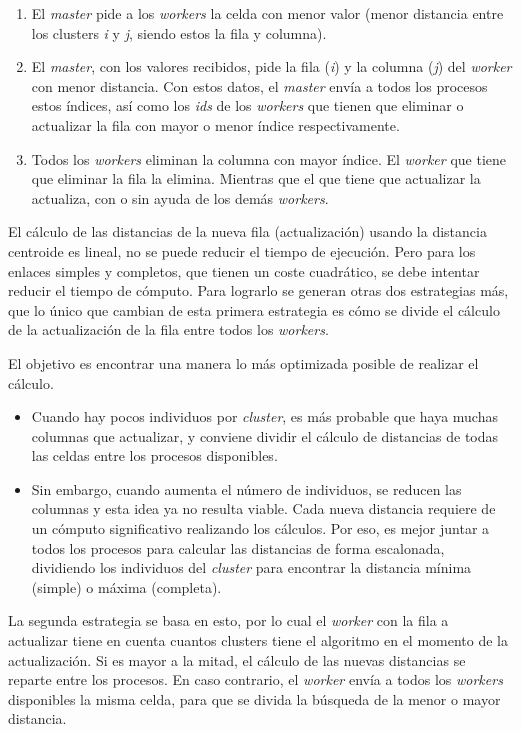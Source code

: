 		\begin{enumerate}
			\item El \textit{master} pide a los \textit{workers} la celda con menor valor (menor distancia entre los clusters \textit{i} y \textit{j}, siendo estos la fila y columna). 
			\item El \textit{master}, con los valores recibidos, pide la fila (\textit{i}) y la columna (\textit{j}) del \textit{worker} con menor distancia. Con estos datos, el \textit{master} envía a todos los procesos estos índices, así como los \textit{ids} de los \textit{workers} que tienen que eliminar o actualizar la fila con mayor o menor índice respectivamente.
			\item Todos los \textit{workers} eliminan la columna con mayor índice. El \textit{worker} que tiene que eliminar la fila la elimina. Mientras que el que tiene que actualizar la actualiza, con o sin ayuda de los demás \textit{workers}.
		\end{enumerate}
								
		
		El cálculo de las distancias de la nueva fila (actualización) usando la distancia centroide es lineal, no se puede reducir el tiempo de ejecución. Pero para los enlaces simples y completos, que tienen un coste cuadrático, se debe intentar reducir el tiempo de cómputo. Para lograrlo se generan otras dos estrategias más, que lo único que cambian de esta primera estrategia es cómo se divide el cálculo de la actualización de la fila entre todos los \textit{workers}. 
		
		El objetivo es encontrar una manera lo más optimizada posible de realizar el cálculo. 
		\begin{itemize}
			\item Cuando hay pocos individuos por \textit{cluster}, es más probable que haya muchas columnas que actualizar, y conviene dividir el cálculo de distancias de todas las celdas entre los procesos disponibles. 
			\item Sin embargo, cuando aumenta el número de individuos, se reducen las columnas y esta idea ya no resulta viable. Cada nueva distancia requiere de un cómputo significativo realizando los cálculos. Por eso, es mejor juntar a todos los procesos para calcular las distancias de forma escalonada, dividiendo los individuos del \textit{cluster} para encontrar la distancia mínima (simple) o máxima (completa).
		\end{itemize}
		
		La segunda estrategia se basa en esto, por lo cual el \textit{worker} con la fila a actualizar tiene en cuenta cuantos clusters tiene el algoritmo en el momento de la actualización. Si es mayor a la mitad, el cálculo de las nuevas distancias se reparte entre los procesos. En caso contrario, el \textit{worker} envía a todos los \textit{workers} disponibles la misma celda, para que se divida la búsqueda de la menor o mayor distancia.
		

